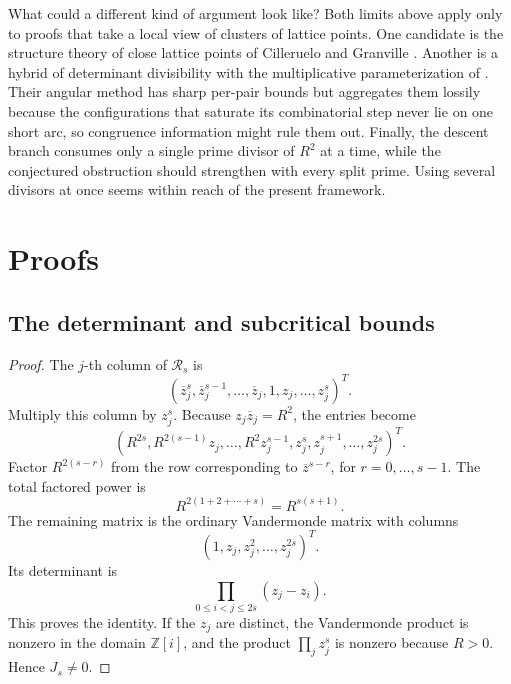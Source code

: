 \documentclass[11pt]{article}
\newcommand{\GI}{\mathbb Z[i]}
\newcommand{\conj}[1]{\overline{#1}}
\begin{document}
What could a different kind of argument look like?
Both limits above apply only to proofs that take a local view of clusters of lattice points. 
One candidate is the structure theory of close lattice points of Cilleruelo and Granville \cite{CillerueloGranville2009}. 
Another is a hybrid of determinant divisibility with the multiplicative parameterization of \cite{CillerueloCordoba1992}.
Their angular method has sharp per-pair bounds but aggregates them lossily because the configurations that saturate its combinatorial step never lie on one short arc, so congruence information might rule them out.
Finally, the descent branch consumes only a single prime divisor of \(R^2\) at a time, while the conjectured obstruction should strengthen with every split prime.
Using several divisors at once seems within reach of the present framework.

\appendix

\section{Proofs}
\label{sec:proofs}

\subsection{The determinant and subcritical bounds}
\label{app:determinant}

\ramanaidentity*

\begin{proof}
The \(j\)-th column of \(\mathcal R_s\) is
\[
  (\conj z_j^s,\conj z_j^{s-1},\ldots,\conj z_j,1,z_j,\ldots,z_j^s)^T.
\]
Multiply this column by \(z_j^s\).
Because \(z_j\conj z_j=R^2\), the entries become
\[
  (R^{2s},R^{2(s-1)}z_j,\ldots,R^2z_j^{s-1},z_j^s,z_j^{s+1},\ldots,z_j^{2s})^T.
\]
Factor \(R^{2(s-r)}\) from the row corresponding to \(\conj z^{s-r}\), for \(r=0,\dots,s-1\).
The total factored power is
\[
  R^{2(1+2+\cdots+s)}=R^{s(s+1)}.
\]
The remaining matrix is the ordinary Vandermonde matrix with columns
\[
  (1,z_j,z_j^2,\ldots,z_j^{2s})^T.
\]
Its determinant is
\[
  \prod_{0\le i<j\le 2s}(z_j-z_i).
\]
This proves the identity.
If the \(z_j\) are distinct, the Vandermonde product is nonzero in the domain \(\GI\), and the product \(\prod_j z_j^s\) is nonzero because \(R>0\).
Hence \(J_s\ne0\).
\end{proof}

\subcriticalobstruction*
\end{document}
